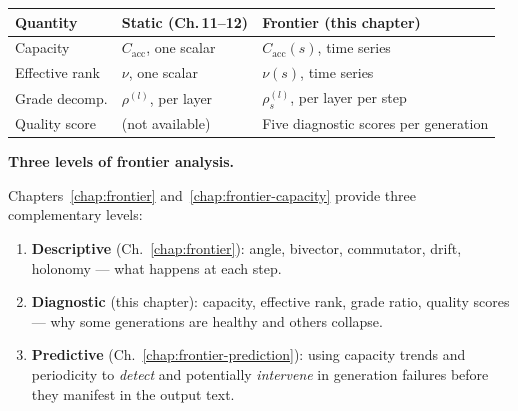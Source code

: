 \documentclass[11pt, twoside, openright]{memoir}
\numberwithin{equation}{chapter}
\begin{document}
\begin{center}
\renewcommand{\arraystretch}{1.4}\small
\begin{tabular}{@{}L{3.2cm} L{4.5cm} L{4.5cm}@{}}
\toprule
\textbf{Quantity} & \textbf{Static (Ch.\,11--12)} &
  \textbf{Frontier (this chapter)} \\
\midrule
Capacity &
  $C_{\mathrm{acc}}$, one scalar &
  $C_{\mathrm{acc}}(s)$, time series \\
Effective rank &
  $\nu$, one scalar &
  $\nu(s)$, time series \\
Grade decomp. &
  $\rho^{(l)}$, per layer &
  $\rho^{(l)}_s$, per layer per step \\
Quality score &
  (not available) &
  Five diagnostic scores per generation \\
\bottomrule
\end{tabular}
\end{center}

\begin{keyidea}
\textbf{Three levels of frontier analysis.}

Chapters~\ref{chap:frontier} and~\ref{chap:frontier-capacity}
provide three complementary levels:

\begin{enumerate}[nosep]
\item \textbf{Descriptive} (Ch.~\ref{chap:frontier}):
  angle, bivector, commutator, drift, holonomy --- what happens at
  each step.
\item \textbf{Diagnostic} (this chapter):
  capacity, effective rank, grade ratio, quality scores --- why
  some generations are healthy and others collapse.
\item \textbf{Predictive} (Ch.~\ref{chap:frontier-prediction}):
  using capacity trends and periodicity to \emph{detect} and
  potentially \emph{intervene} in generation failures before they
  manifest in the output text.
\end{enumerate}
\end{keyidea}
\end{document}
